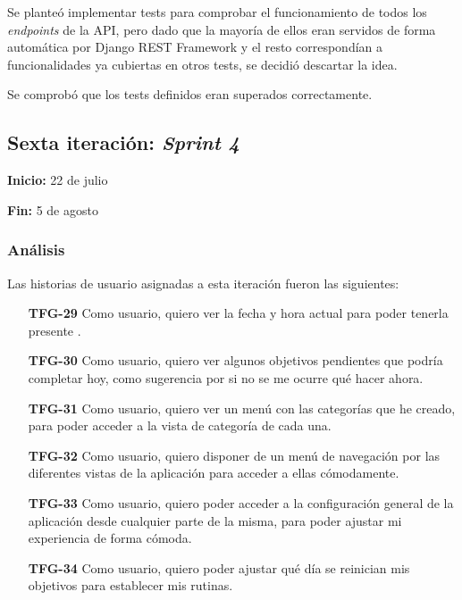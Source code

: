 \documentclass[10pt, a4paper]{aqademic}
\begin{document}
Se planteó implementar tests para comprobar el funcionamiento de todos los \textit{endpoints} de la API, pero dado que la mayoría de ellos eran servidos de forma automática por Django REST Framework y el resto correspondían a funcionalidades ya cubiertas en otros tests, se decidió descartar la idea.

Se comprobó que los tests definidos eran superados correctamente.


\subsection{Sexta iteración: \textit{Sprint 4}}

\textbf{Inicio:} 22 de julio

\textbf{Fin:} 5 de agosto


\subsubsection{Análisis}

Las historias de usuario asignadas a esta iteración fueron las siguientes:

\begin{itemize}[leftmargin=16mm]
	\item [\textbf{TFG-29}] Como usuario, quiero ver la fecha y hora actual para poder tenerla presente .
	
	\item [\textbf{TFG-30}] Como usuario, quiero ver algunos objetivos pendientes que podría completar hoy, como sugerencia por si no se me ocurre qué hacer ahora.
	
	\item [\textbf{TFG-31}] Como usuario, quiero ver un menú con las categorías que he creado, para poder acceder a la vista de categoría de cada una.
	
	\item [\textbf{TFG-32}] Como usuario, quiero disponer de un menú de navegación por las diferentes vistas de la aplicación para acceder a ellas cómodamente.
	
	\item [\textbf{TFG-33}] Como usuario, quiero poder acceder a la configuración general de la aplicación desde cualquier parte de la misma, para poder ajustar mi experiencia de forma cómoda.
	
	\item [\textbf{TFG-34}] Como usuario, quiero poder ajustar qué día se reinician mis objetivos para establecer mis rutinas.
\end{itemize}
\end{document}
